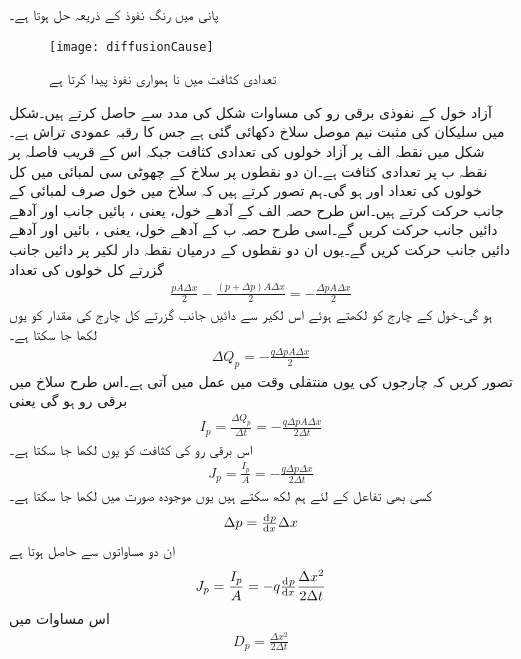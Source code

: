 پانی میں رنگ نفوذ کے ذریعہ حل ہوتا ہے۔
\begin{figure}
\centering
\texttt{[image: diffusionCause]}
\caption{ تعدادی کثافت میں نا ہمواری نفوذ پیدا کرتا ہے}
\label{شکل_نفوذ}
\end{figure}
آزاد خول کے نفوذی برقی رو کی مساوات شکل   کی مدد سے حاصل کرتے ہیں۔شکل میں سلیکان کی مثبت نیم موصل سلاخ دکھائی گئی ہے جس کا رقبہ عمودی تراش  ہے۔شکل میں نقطہ  الف پر آزاد خولوں کی تعدادی کثافت   جبکہ اس کے قریب   فاصلہ پر نقطہ  ب پر تعدادی کثافت  ہے۔ان دو نقطوں پر سلاخ کے چھوٹی سی لمبائی  میں کل خولوں کی تعداد   اور  ہو گی۔ہم تصور کرتے ہیں کہ سلاخ میں خول صرف لمبائی کے جانب حرکت کرتے ہیں۔اس طرح حصہ  الف کے آدھے خول، یعنی ،  بائیں جانب اور آدھے دائیں جانب حرکت کریں گے۔اسی طرح حصہ  ب کے آدھے خول، یعنی  ، بائیں اور آدھے دائیں جانب حرکت کریں گے۔یوں ان دو نقطوں کے درمیان نقطہ دار لکیر پر دائیں جانب گزرتے کل خولوں کی تعداد
\begin{align*}
\frac{p A \Delta x}{2}-\frac{(p+\Delta p ) A \Delta x}{2}=-\frac{\Delta p A \Delta x}{2}
\end{align*}
 ہو گی۔خول کے چارج کو  لکھتے ہوئے اس لکیر سے دائیں جانب گزرتے کل چارج کی مقدار کو یوں لکھا جا سکتا ہے۔
\begin{align*}
\Delta Q_p = -\frac{q \Delta p A \Delta x}{2}
\end{align*}
	تصور کریں کہ چارجوں کی یوں منتقلی وقت   میں عمل میں آتی ہے۔اس طرح سلاخ میں برقی رو ہو گی یعنی
\begin{align*}
I_p=\frac{\Delta Q_p}{\Delta t} = -\frac{q \Delta p A \Delta x}{2 \Delta t}
\end{align*}
اس برقی رو کی کثافت  کو یوں لکھا جا سکتا ہے۔
\begin{align}
J_p=\frac{I_p}{A} = -\frac{q \Delta p \Delta x}{2 \Delta t}
\end{align}
کسی بھی تفاعل   کے لئے ہم لکھ سکتے ہیں
یوں موجودہ صورت میں لکھا جا سکتا ہے۔
\begin{align}
\Delta p = \od{p}{x} \Delta x
\end{align}
ان دو مساواتوں سے حاصل ہوتا ہے
\begin{align}
J_p = \frac{I_p}{A}=-q \od{p}{x} \frac{\Delta x^2}{2 \Delta t}
\end{align}
اس مساوات میں
\begin{align}
D_p = \frac{\Delta x^2}{2 \Delta t}
\end{align}
